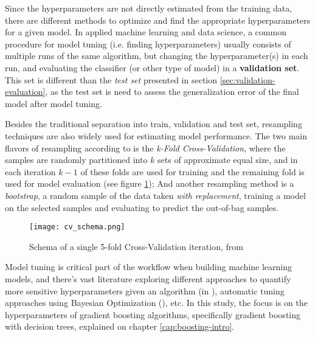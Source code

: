 Since the hyperparameters are not directly estimated from the training data, there are different methods to optimize and find the appropriate hyperparameters for a given model. In applied machine learning and data science, a common procedure for model tuning (i.e. finding hyperparameters) usually consists of multiple runs of the same algorithm, but changing the hyperparameter(s) in each run, and evaluating the classifier (or other type of model) in a \textbf{validation set}. This set is different than the \textit{test set} presented in section \ref{sec:validation-evaluation}, as the test set is need to assess the generalization error of the final model after model tuning. 

Besides the traditional separation into train, validation and test set, resampling techniques are also widely used for estimating model performance. The two main flavors of resampling according to \cite{kuhn2013applied} is the \textit{k-Fold Cross-Validation}, where the samples are randomly partitioned into $k$ sets of approximate equal size, and in each iteration $k - 1$ of these folds are used for training and the remaining fold is used for model evaluation (see figure \ref{fig:cvschema}); And another resampling method is a \textit{bootstrap}, a random sample of the data taken \textit{with replacement}, training a model on the selected samples and evaluating to predict the out-of-bag samples.

\begin{figure}[!h]
    \centering
    \texttt{[image: cv\_schema.png]} 
    \caption{Schema of a single 5-fold Cross-Validation iteration, from \cite{hastie2009elements}}
    \label{fig:cvschema}
\end{figure}

Model tuning is critical part of the workflow when building machine learning models, and there's vast literature exploring different approaches to quantify more sensitive hyperparameters given an algorithm (in \cite{probst2018tunability}), automatic tuning approaches using Bayesian Optimization (\cite{bergstra2013hyperopt}), etc. In this study, the focus is on the hyperparameters of gradient boosting algorithms, specifically gradient boosting with decision trees, explained on chapter \ref{cap:boosting-intro}.


